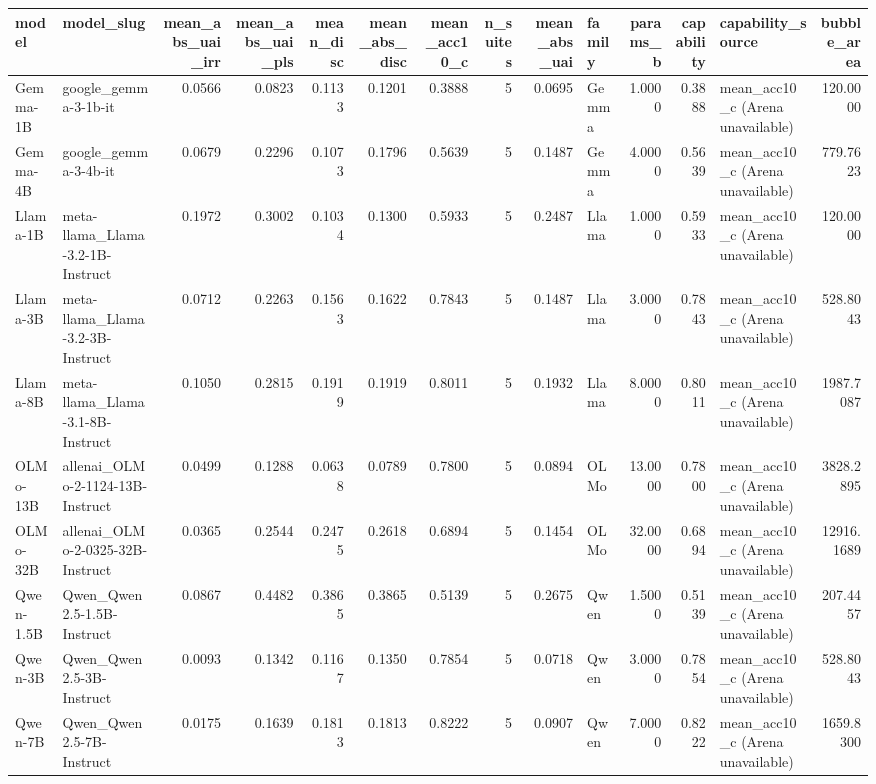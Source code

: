 \begin{tabular}{llrrrrrrrlrrlr}
\toprule
model & model_slug & mean_abs_uai_irr & mean_abs_uai_pls & mean_disc & mean_abs_disc & mean_acc10_c & n_suites & mean_abs_uai & family & params_b & capability & capability_source & bubble_area \\
\midrule
Gemma-1B & google_gemma-3-1b-it & 0.0566 & 0.0823 & 0.1133 & 0.1201 & 0.3888 & 5 & 0.0695 & Gemma & 1.0000 & 0.3888 & mean_acc10_c (Arena unavailable) & 120.0000 \\
Gemma-4B & google_gemma-3-4b-it & 0.0679 & 0.2296 & 0.1073 & 0.1796 & 0.5639 & 5 & 0.1487 & Gemma & 4.0000 & 0.5639 & mean_acc10_c (Arena unavailable) & 779.7623 \\
Llama-1B & meta-llama_Llama-3.2-1B-Instruct & 0.1972 & 0.3002 & 0.1034 & 0.1300 & 0.5933 & 5 & 0.2487 & Llama & 1.0000 & 0.5933 & mean_acc10_c (Arena unavailable) & 120.0000 \\
Llama-3B & meta-llama_Llama-3.2-3B-Instruct & 0.0712 & 0.2263 & 0.1563 & 0.1622 & 0.7843 & 5 & 0.1487 & Llama & 3.0000 & 0.7843 & mean_acc10_c (Arena unavailable) & 528.8043 \\
Llama-8B & meta-llama_Llama-3.1-8B-Instruct & 0.1050 & 0.2815 & 0.1919 & 0.1919 & 0.8011 & 5 & 0.1932 & Llama & 8.0000 & 0.8011 & mean_acc10_c (Arena unavailable) & 1987.7087 \\
OLMo-13B & allenai_OLMo-2-1124-13B-Instruct & 0.0499 & 0.1288 & 0.0638 & 0.0789 & 0.7800 & 5 & 0.0894 & OLMo & 13.0000 & 0.7800 & mean_acc10_c (Arena unavailable) & 3828.2895 \\
OLMo-32B & allenai_OLMo-2-0325-32B-Instruct & 0.0365 & 0.2544 & 0.2475 & 0.2618 & 0.6894 & 5 & 0.1454 & OLMo & 32.0000 & 0.6894 & mean_acc10_c (Arena unavailable) & 12916.1689 \\
Qwen-1.5B & Qwen_Qwen2.5-1.5B-Instruct & 0.0867 & 0.4482 & 0.3865 & 0.3865 & 0.5139 & 5 & 0.2675 & Qwen & 1.5000 & 0.5139 & mean_acc10_c (Arena unavailable) & 207.4457 \\
Qwen-3B & Qwen_Qwen2.5-3B-Instruct & 0.0093 & 0.1342 & 0.1167 & 0.1350 & 0.7854 & 5 & 0.0718 & Qwen & 3.0000 & 0.7854 & mean_acc10_c (Arena unavailable) & 528.8043 \\
Qwen-7B & Qwen_Qwen2.5-7B-Instruct & 0.0175 & 0.1639 & 0.1813 & 0.1813 & 0.8222 & 5 & 0.0907 & Qwen & 7.0000 & 0.8222 & mean_acc10_c (Arena unavailable) & 1659.8300 \\
\bottomrule
\end{tabular}
